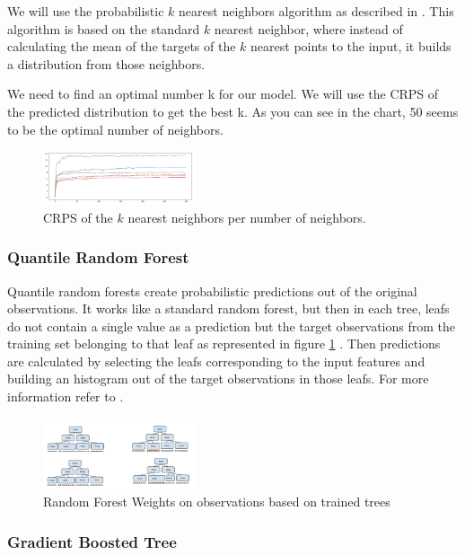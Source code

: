 \documentclass[a4paper,twocolumn,5p]{elsarticle}
\begin{document}
We will use the probabilistic $k$ nearest neighbors algorithm as described in  
\cite{quantileknnmangalova}. 
This algorithm is based on the standard $k$ nearest neighbor, where instead of calculating the mean of 
the targets of the
$k$ nearest points to the input, it builds a distribution 
from those neighbors.

We need to find an optimal number k for our model. We will use the CRPS of the predicted distribution
to get the best k. As you can see in the chart, 50 seems to be the optimal 
number of neighbors.

\begin{figure}
  \caption{CRPS of the $k$ nearest neighbors per number of neighbors.}
  \centering
  \includegraphics[width=0.4\textwidth]{kneighbor_crps}
\end{figure}

\subsubsection{Quantile Random Forest}

Quantile random forests create probabilistic predictions out of 
the original observations. It works like a standard random forest, but then in each tree,
leafs do not contain a single value as a prediction but the target observations from the training set 
belonging to that leaf as represented in figure \ref{figure:qrandom} . 
Then predictions are calculated by selecting the leafs corresponding to the input features and 
building an histogram out of the target observations in those leafs. For more information refer to 
\cite{quantregforests}.

\begin{figure}
  \centering
  \includegraphics[width=0.4\textwidth]{quantile_random_forest}
  \caption{Random Forest Weights on observations based on trained trees}
  \label{figure:qrandom}
\end{figure}

\subsubsection{Gradient Boosted Tree}
\end{document}
